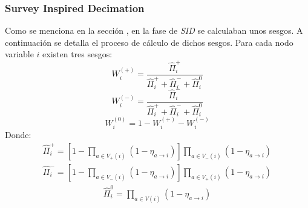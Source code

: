 \subsubsection{Survey Inspired Decimation}
Como se menciona en la sección , en la fase de \textit{SID} se calculaban unos sesgos. A continuación se detalla el proceso de cálculo de dichos sesgos. Para cada nodo variable $i$ existen tres sesgos:
\begin{equation}
	W_i^{(+)} = \frac{\hat{\Pi}_{i}^+}{\hat{\Pi}_{i}^+ + \hat{\Pi}_{i}^- + \hat{\Pi}_{i}^0} 
\end{equation}
\begin{equation}
	W_i^{(-)} = \frac{\hat{\Pi}_{i}^-}{\hat{\Pi}_{i}^+ + \hat{\Pi}_{i}^- + \hat{\Pi}_{i}^0}
\end{equation} 
\begin{equation}
	W_i^{(0)} = 1 - W_i^{(+)} - W_i^{(-)}
\end{equation}
Donde: 
\begin{equation}
	\begin{aligned}
		\hat{\Pi}_{i}^+ = \left[ 1 - \prod_{a \in V_+(i)}(1 - \eta_{a\rightarrow i}) \right] \prod_{a \in V_-(i)}(1 - \eta_{a\rightarrow i})	
	\end{aligned}
\end{equation}
\begin{equation}
	\begin{aligned}
	\hat{\Pi}_{i}^- = \left[ 1 - \prod_{a \in V_-(i)}(1 - \eta_{a\rightarrow i}) \right] \prod_{a \in V_+(i)}(1 - \eta_{a\rightarrow i})	
	\end{aligned}
\end{equation}
\begin{equation}
	\begin{aligned}
		\hat{\Pi}_{i}^0 = \prod_{a \in V(i)}(1 - \eta_{a\rightarrow i})
	\end{aligned}
\end{equation}                               



